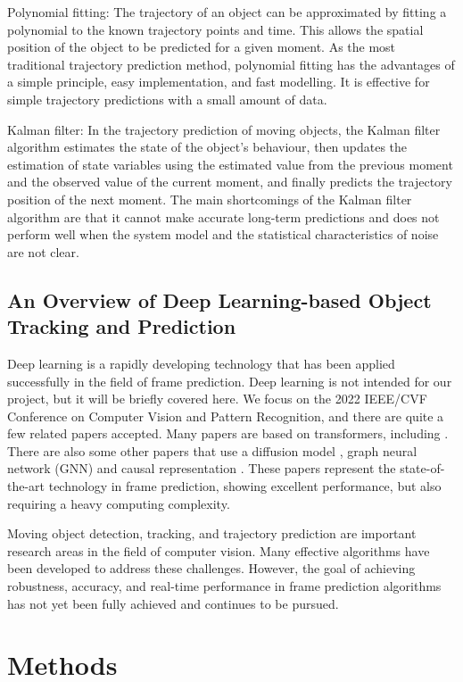 \documentclass[12pt]{article}
\begin{document}
Polynomial fitting: The trajectory of an object can be approximated by fitting a polynomial to the known trajectory points and time. This allows the spatial position of the object to be predicted for a given moment. As the most traditional trajectory prediction method, polynomial fitting has the advantages of a simple principle, easy implementation, and fast modelling. It is effective for simple trajectory predictions with a small amount of data.

Kalman filter: In the trajectory prediction of moving objects, the Kalman filter algorithm estimates the state of the object's behaviour, then updates the estimation of state variables using the estimated value from the previous moment and the observed value of the current moment, and finally predicts the trajectory position of the next moment. The main shortcomings of the Kalman filter algorithm are that it cannot make accurate long-term predictions and does not perform well when the system model and the statistical characteristics of noise are not clear.

\subsection*{An Overview of Deep Learning-based Object Tracking and Prediction}
Deep learning is a rapidly developing technology that has been applied successfully in the field of frame prediction. Deep learning is not intended for our project, but it will be briefly covered here.
We focus on the 2022 IEEE/CVF Conference on Computer Vision and Pattern Recognition, and there are quite a few related papers accepted. Many papers are based on transformers, including \cite{mayer2022transforming} \cite{cao2022tctrack} \cite{Zhou2022GlobalTT}. There are also some other papers that use a diffusion model \cite{gu2022stochastic},  graph neural network (GNN) \cite{xu2022adaptive} and causal representation \cite{liu2022towards}. These papers represent the state-of-the-art technology in frame prediction, showing excellent performance, but also requiring a heavy computing complexity.

Moving object detection, tracking, and trajectory prediction are important research areas in the field of computer vision. Many effective algorithms have been developed to address these challenges. However, the goal of achieving robustness, accuracy, and real-time performance in frame prediction algorithms has not yet been fully achieved and continues to be pursued.


\section*{Methods}
\end{document}
